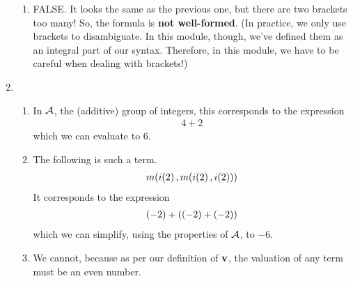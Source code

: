 \begin{solution}
\begin{enumerate}
\begin{enumerate}
            \item FALSE. It looks the same as the previous one, but there are two brackets too many! So, the formula is \textbf{not well-formed}. (In practice, we only use brackets to disambiguate. In this module, though, we've defined them as an integral part of our syntax. Therefore, in this module, we have to be careful when dealing with brackets!)
        \end{enumerate}
        \item
        \begin{enumerate}
            \item In $\mathcal{A}$, the (additive) group of integers, this corresponds to the expression
            \begin{align*}
                4 + 2
            \end{align*}
            which we can evaluate to $6$.

            \item The following is such a term.
            \begin{align*}
                m\!\left( i\!\left( 2 \right), m\!\left( i\!\left( 2 \right), i\!\left( 2 \right) \right) \right)
            \end{align*}
            It corresponds to the expression
            \begin{align*}
                \left( -2 \right) + \left( \left( -2 \right) + \left( -2 \right) \right)
            \end{align*}
            which we can simplify, using the properties of $\mathcal{A}$, to $-6$.

            \item We cannot, because as per our definition of $\mathbf{v}$, the valuation of any term must be an even number.
        \end{enumerate}
    \end{enumerate}    
\end{solution}
